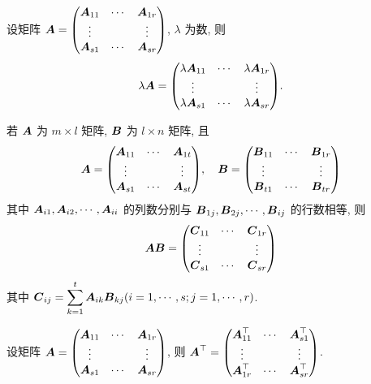 \begin{theorem}[分块矩阵的数乘]
    设矩阵 $ \vb*{A}=\mqty(\vb*{A}_{11} & \cdots & \vb*{A}_{1 r} \\ \vdots & & \vdots \\ \vb*{A}_{s 1} & \cdots & \vb*{A}_{s r})$, $\lambda $ 为数, 则
    $$\lambda  \vb*{A}=\mqty(\lambda  \vb*{A}_{11} & \cdots & \lambda  \vb*{A}_{1 r} \\
        \vdots & & \vdots \\
        \lambda  \vb*{A}_{s 1} & \cdots & \lambda  \vb*{A}_{s r}).$$
\end{theorem}

\begin{theorem}[分块矩阵的乘法]
    若 $ \vb*{A} $ 为 $ m \times l $ 矩阵, $ \vb*{B} $ 为 $ l \times n $ 矩阵, 且
    $$\vb*{A}=\mqty(\vb*{A}_{11}  & \cdots & \vb*{A}_{1 t} \\
        \vdots        &        & \vdots        \\
        \vb*{A}_{s 1} & \cdots & \vb*{A}_{s t})
        , \quad \vb*{B}=\mqty(\vb*{B}_{11}  & \cdots & \vb*{B}_{1 r} \\
        \vdots        &        & \vdots        \\
        \vb*{B}_{t 1} & \cdots & \vb*{B}_{t r})$$
    其中 $ \vb*{A}_{i 1}, \vb*{A}_{i 2}, \cdots, \vb*{A}_{i i} $ 的列数分别与 $ \vb*{B}_{1 j}, \vb*{B}_{2 j}, \cdots, \vb*{B}_{i j} $ 的行数相等, 则
    $$\vb*{A B}=\mqty(\vb*{C}_{11}  & \cdots & \vb*{C}_{1 r} \\
        \vdots  &        & \vdots  \\
        \vb*{C}_{s 1} & \cdots & \vb*{C}_{s r})$$
    其中 $ \vb*{C}_{i j}=\displaystyle \sum_{k=1}^{t} \vb*{A}_{i k} \vb*{B}_{k j}(i=1, \cdots, s ; j=1, \cdots, r) $.
\end{theorem}

\begin{theorem}[分块矩阵的转置]
    设矩阵 $ \vb*{A}=\mqty(\vb*{A}_{11} & \cdots & \vb*{A}_{1 r} \\ \vdots & & \vdots \\ \vb*{A}_{s 1} & \cdots & \vb*{A}_{s r})
    $, 则 $ \vb*{A}^{\top}=\mqty(\vb*{A}_{11}^{\top} & \cdots & \vb*{A}_{s 1}^{\top} \\ \vdots & & \vdots \\ \vb*{A}_{1 r}^{\top} & \cdots & \vb*{A}_{s r}^{\top}) $.
\end{theorem}

